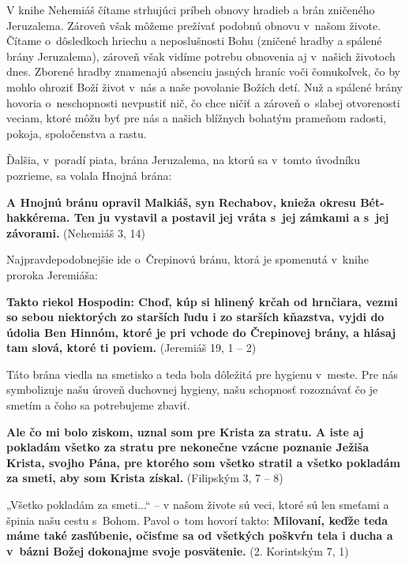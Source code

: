 


V knihe Nehemiáš čítame strhujúci príbeh obnovy hradieb a brán zničeného Jeruzalema. Zároveň však môžeme prežívať podobnú obnovu v~našom živote. Čítame o~dôsledkoch hriechu a neposlušnosti Bohu (zničené hradby a spálené brány Jeruzalema), zároveň však vidíme potrebu obnovenia aj v~našich životoch dnes. Zborené hradby znamenajú absenciu jasných hraníc voči čomukoľvek, čo by mohlo ohroziť Boží život v~nás a naše povolanie Božích detí. Nuž a spálené brány hovoria o~neschopnosti nevpustiť nič, čo chce ničiť a zároveň o~slabej otvorenosti veciam, ktoré môžu byť pre nás a našich blížnych bohatým prameňom radosti, pokoja, spoločenstva a rastu.

Ďalšia, v~poradí piata, brána Jeruzalema, na ktorú sa v~tomto úvodníku pozrieme, sa volala Hnojná brána:

{\bf A Hnojnú bránu opravil Malkiáš, syn Rechabov, knieža okresu Bét-hakkérema. Ten ju vystavil a postavil jej vráta s~jej zámkami a s~jej závorami.} (Nehemiáš 3, 14)

Najpravdepodobnejšie ide o~Črepinovú bránu, ktorá je spomenutá v~knihe proroka Jeremiáša:

{\bf Takto riekol Hospodin: Choď, kúp si hlinený krčah od hrnčiara, vezmi so sebou niektorých zo starších ľudu i zo starších kňazstva, vyjdi do údolia Ben Hinnóm, ktoré je pri vchode do Črepinovej brány, a hlásaj tam slová, ktoré ti poviem.} (Jeremiáš 19, 1 -- 2)

Táto brána viedla na smetisko a teda bola dôležitá pre hygienu v~meste. Pre nás symbolizuje našu úroveň duchovnej hygieny, našu schopnosť rozoznávať čo je smetím a čoho sa potrebujeme zbaviť.

{\bf Ale čo mi bolo ziskom, uznal som pre Krista za stratu. A iste aj pokladám všetko za stratu pre nekonečne vzácne poznanie Ježiša Krista, svojho Pána, pre ktorého som všetko stratil a všetko pokladám za smeti, aby som Krista získal.} (Filipským 3, 7 -- 8)

„Všetko pokladám za smeti...“ -- v našom živote sú veci, ktoré sú len smeťami a špinia našu cestu s~Bohom. Pavol o~tom hovorí takto:
{\bf Milovaní, keďže teda máme také zasľúbenie, očisťme sa od všetkých poškvŕn tela i ducha a v~bázni Božej dokonajme svoje posvätenie.} (2. Korintským 7, 1)

